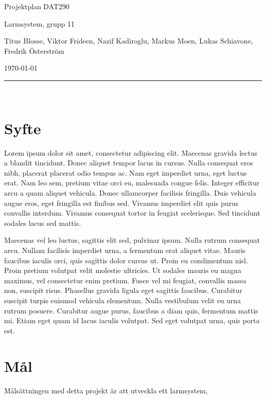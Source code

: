 \documentclass{article}
\begin{document}
\begin{center}
\thispagestyle{empty}
\parskip=14pt%
\vspace*{3\parskip}%

{\LARGE Projektplan DAT290}

{\large Larmsystem, grupp 11

Titus Blosse, Viktor Frideen, Nazif Kadiroglu, Markus Moen, Lukas Schiavone, Fredrik Österström

\today}


\rule{7cm}{0.4pt}\\
\end{center}
\newpage

\thispagestyle{empty}
\tableofcontents
\newpage


\section{Syfte}
Lorem ipsum dolor sit amet, consectetur adipiscing elit. Maecenas gravida lectus a blandit tincidunt. Donec aliquet tempor lacus in cursus. Nulla consequat eros nibh, placerat placerat odio tempus ac. Nam eget imperdiet urna, eget luctus erat. Nam leo sem, pretium vitae orci eu, malesuada congue felis. Integer efficitur arcu a quam aliquet vehicula. Donec ullamcorper facilisis fringilla. Duis vehicula augue eros, eget fringilla est finibus sed. Vivamus imperdiet elit quis purus convallis interdum. Vivamus consequat tortor in feugiat scelerisque. Sed tincidunt sodales lacus sed mattis.\par
Maecenas vel leo luctus, sagittis elit sed, pulvinar ipsum. Nulla rutrum consequat arcu. Nullam facilisis imperdiet urna, a fermentum erat aliquet vitae. Mauris faucibus iaculis orci, quis sagittis dolor cursus ut. Proin eu condimentum nisl. Proin pretium volutpat velit molestie ultricies. Ut sodales mauris eu magna maximus, vel consectetur enim pretium. Fusce vel mi feugiat, convallis massa non, suscipit risus. Phasellus gravida ligula eget sagittis faucibus. Curabitur suscipit turpis euismod vehicula elementum. Nulla vestibulum velit eu urna rutrum posuere. Curabitur augue purus, faucibus a diam quis, fermentum mattis mi. Etiam eget quam id lacus iaculis volutpat. Sed eget volutpat urna, quis porta est.

\section{Mål}
Målsättningen med detta projekt är att utveckla ett larmsystem, 
\end{document}
